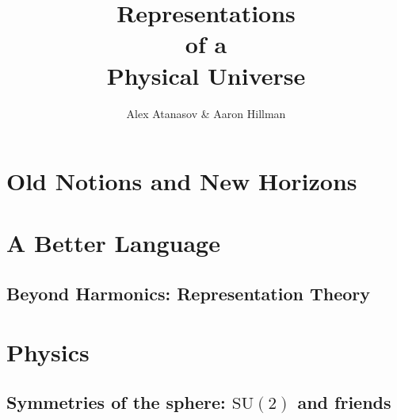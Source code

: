 \documentclass[12pt, twoside, openany]{book}
\title{\textbf{\Huge Representations\\ \large of a\\ \LARGE Physical \LARGE Universe}}
\author{Alex Atanasov \& Aaron Hillman}
\newcommand{\1}{\mathbbm{1}}
\begin{document}
\maketitle
\tableofcontents




	









\part{Old Notions and New Horizons}









\part{A Better Language}



\chapter{Beyond Harmonics: Representation Theory}


\part{Physics}

\chapter{Symmetries of the sphere: $\mathrm{SU}(2)$ and friends}
\end{document}
